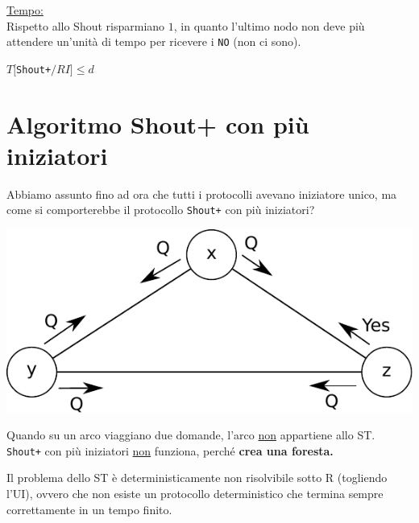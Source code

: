 \underline{Tempo:}\\
Rispetto allo Shout risparmiano $1$, in quanto l'ultimo nodo non deve più
attendere un'unità di tempo per ricevere i \texttt{NO} (non ci sono).
\begin{center}
    $T[$\texttt{Shout+}$/RI] \leq d$
\end{center}

\section{Algoritmo Shout+ con più iniziatori}
Abbiamo assunto fino ad ora che tutti i protocolli avevano iniziatore unico, ma
come si comporterebbe il protocollo \texttt{Shout+} con più iniziatori?
\begin{center}
    \includegraphics[scale=0.8]{images/n_36}
\end{center}
Quando su un arco viaggiano due domande, l'arco \underline{non} appartiene allo
ST. \\
\texttt{Shout+} con più iniziatori \underline{non} funziona, perché \textbf{crea
    una foresta.}

\begin{theorem}
    Il problema dello ST è deterministicamente non risolvibile sotto R
    (togliendo l'UI), ovvero che non esiste un protocollo deterministico che
    termina sempre correttamente in un tempo finito.
\end{theorem}

